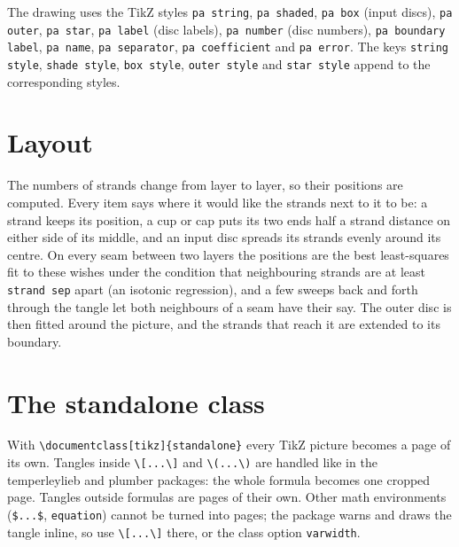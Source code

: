 \documentclass[11pt]{article}
\newenvironment{result}{\par\smallskip\noindent\hspace*{1em}}{\par\medskip}
\newcommand\opt[1]{\texttt{#1}}
\begin{document}
The drawing uses the TikZ styles \opt{pa string}, \opt{pa shaded},
\opt{pa box} (input discs), \opt{pa outer}, \opt{pa star}, \opt{pa label}
(disc labels), \opt{pa number} (disc numbers), \opt{pa boundary label},
\opt{pa name}, \opt{pa separator}, \opt{pa coefficient} and \opt{pa error}.
The keys \opt{string style}, \opt{shade style}, \opt{box style},
\opt{outer style} and \opt{star style} append to the corresponding styles.

\begin{code}
\end{code}
\begin{result}
  \qquad
  \qquad
\end{result}

\section{Layout}

The numbers of strands change from layer to layer, so their positions are
computed. Every item says where it would like the strands next to it to be:
a strand keeps its position, a cup or cap puts its two ends half a strand
distance on either side of its middle, and an input disc spreads its strands
evenly around its centre. On every seam between two layers the positions are
the best least-squares fit to these wishes under the condition that
neighbouring strands are at least \opt{strand sep} apart (an isotonic
regression), and a few sweeps back and forth through the tangle let both
neighbours of a seam have their say. The outer disc is then fitted around the
picture, and the strands that reach it are extended to its boundary.

\section{The standalone class}

With \verb|\documentclass[tikz]{standalone}| every TikZ picture becomes a
page of its own. Tangles inside \verb|\[...\]| and \verb|\(...\)| are handled
like in the \textsf{temperleylieb} and \textsf{plumber} packages: the whole
formula becomes one cropped page. Tangles outside formulas are pages of
their own. Other math environments (\verb|$...$|, \verb|equation|) cannot be
turned into pages; the package warns and draws the tangle inline, so use
\verb|\[...\]| there, or the class option \opt{varwidth}.
\end{document}
